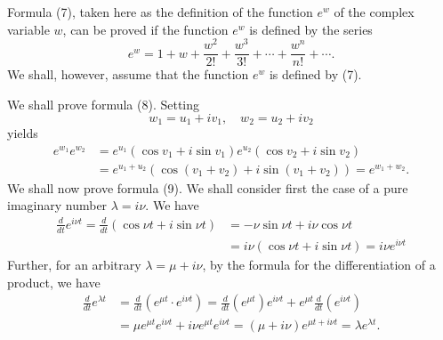 \documentclass[10pt,a5paper]{book}
\theoremstyle{plain}
\theoremstyle{definition}
\theoremstyle{remark}
\begin{document}
Formula (7), taken here as the definition of the function $e^{w}$ of the complex variable $w$, can be proved if the function $e^{w}$ is defined by the series
\[
e^{w}=1+w+\frac{w^{2}}{2!}+\frac{w^{3}}{3!}+\cdots+\frac{w^{n}}{n!}+\cdots .
\]
We shall, however, assume that the function $e^{w}$ is defined by (7).

We shall prove formula (8). Setting
\[
w_{1}=u_{1}+i v_{1}, \quad w_{2}=u_{2}+i v_{2}
\]
yields
\[
\begin{aligned}
e^{w_{1}} e^{w_{2}} & =e^{u_{1}}\left(\cos v_{1}+i \sin v_{1}\right) e^{u_{2}}\left(\cos v_{2}+i \sin v_{2}\right) \\
& =e^{u_{1}+u_{2}}\left(\cos \left(v_{1}+v_{2}\right)+i \sin \left(v_{1}+v_{2}\right)\right)=e^{w_{1}+w_{2}} .
\end{aligned}
\]
We shall now prove formula (9). We shall consider first the case of a pure imaginary number $\lambda=i \nu$. We have
\[
\begin{aligned}
\frac{d}{d t} e^{i \nu t}=\frac{d}{d t}(\cos \nu t+i \sin \nu t) & =-\nu \sin \nu t+i \nu \cos \nu t \\
& =i \nu(\cos \nu t+i \sin \nu t)=i \nu e^{i \nu t}
\end{aligned}
\]
Further, for an arbitrary $\lambda=\mu+i \nu$, by the formula for the differentiation of a product, we have
\[
\begin{aligned}
\frac{d}{d t} e^{\lambda t} & =\frac{d}{d t}\left(e^{\mu t} \cdot e^{i \nu t}\right)=\frac{d}{d t}\left(e^{\mu t}\right) e^{i \nu t}+e^{\mu t} \frac{d}{d t}\left(e^{i \nu t}\right) \\
& =\mu e^{\mu t} e^{i \nu t}+i \nu e^{\mu t} e^{i \nu t}=(\mu+i \nu) e^{\mu t+i \nu t}=\lambda e^{\lambda t} .
\end{aligned}
\]
\end{document}
